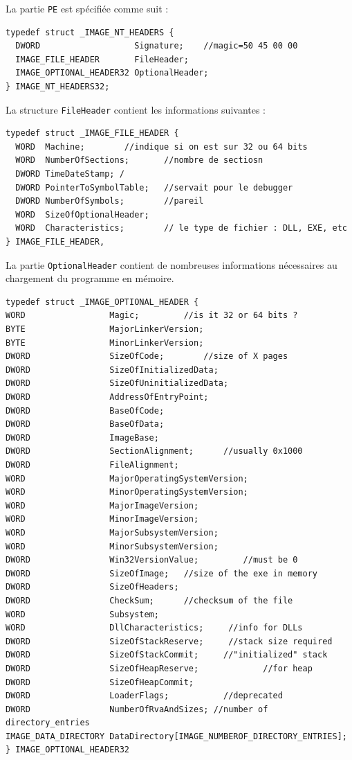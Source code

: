 \documentclass{book}
\newcommand{\code}[1]{\texttt{#1}}
\begin{document}
La partie \code{PE} est spécifiée comme suit : %
\begin{verbatim}
typedef struct _IMAGE_NT_HEADERS {
  DWORD                   Signature;	//magic=50 45 00 00
  IMAGE_FILE_HEADER       FileHeader;	
  IMAGE_OPTIONAL_HEADER32 OptionalHeader;
} IMAGE_NT_HEADERS32;
\end{verbatim} 

 La structure \code{FileHeader} contient les informations suivantes : 

\begin{verbatim}
typedef struct _IMAGE_FILE_HEADER {
  WORD  Machine;		//indique si on est sur 32 ou 64 bits
  WORD  NumberOfSections;       //nombre de sectiosn
  DWORD TimeDateStamp; /
  DWORD PointerToSymbolTable;   //servait pour le debugger
  DWORD NumberOfSymbols;        //pareil
  WORD  SizeOfOptionalHeader;
  WORD  Characteristics;        // le type de fichier : DLL, EXE, etc
} IMAGE_FILE_HEADER,
\end{verbatim}

La partie \code{OptionalHeader} contient de nombreuses informations nécessaires au chargement du programme en mémoire. 

\begin{verbatim}
typedef struct _IMAGE_OPTIONAL_HEADER {
WORD                 Magic;		    //is it 32 or 64 bits ?
BYTE                 MajorLinkerVersion;
BYTE                 MinorLinkerVersion;
DWORD                SizeOfCode;	   	//size of X pages
DWORD                SizeOfInitializedData;
DWORD                SizeOfUninitializedData;
DWORD                AddressOfEntryPoint;
DWORD                BaseOfCode;
DWORD                BaseOfData;
DWORD                ImageBase;
DWORD                SectionAlignment;    	//usually 0x1000
DWORD                FileAlignment;
WORD                 MajorOperatingSystemVersion;
WORD                 MinorOperatingSystemVersion;
WORD                 MajorImageVersion;
WORD                 MinorImageVersion;
WORD                 MajorSubsystemVersion;
WORD                 MinorSubsystemVersion;
DWORD                Win32VersionValue;		    //must be 0
DWORD                SizeOfImage;  	//size of the exe in memory
DWORD                SizeOfHeaders;
DWORD                CheckSum;	  	//checksum of the file
WORD                 Subsystem;
WORD                 DllCharacteristics;	 //info for DLLs
DWORD                SizeOfStackReserve;	 //stack size required
DWORD                SizeOfStackCommit;  	//"initialized" stack
DWORD                SizeOfHeapReserve;     		//for heap
DWORD                SizeOfHeapCommit;
DWORD                LoaderFlags;			//deprecated
DWORD                NumberOfRvaAndSizes; //number of directory_entries
IMAGE_DATA_DIRECTORY DataDirectory[IMAGE_NUMBEROF_DIRECTORY_ENTRIES];
} IMAGE_OPTIONAL_HEADER32
\end{verbatim}
\end{document}
